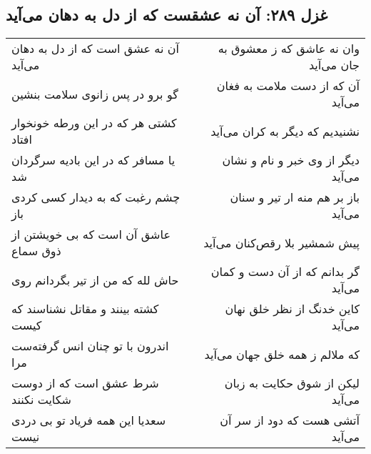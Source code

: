\begin{center}
\section*{غزل ۲۸۹: آن نه عشقست که از دل به دهان می‌آید}
\label{sec:289}
\begin{longtable}{l p{0.5cm} r}
آن نه عشق است که از دل به دهان می‌آید
&&
وان نه عاشق که ز معشوق به جان می‌آید
\\
گو برو در پس زانوی سلامت بنشین
&&
آن که از دست ملامت به فغان می‌آید
\\
کشتی هر که در این ورطه خونخوار افتاد
&&
نشنیدیم که دیگر به کران می‌آید
\\
یا مسافر که در این بادیه سرگردان شد
&&
دیگر از وی خبر و نام و نشان می‌آید
\\
چشم رغبت که به دیدار کسی کردی باز
&&
باز بر هم منه ار تیر و سنان می‌آید
\\
عاشق آن است که بی خویشتن از ذوق سماع
&&
پیش شمشیر بلا رقص‌کنان می‌آید
\\
حاش لله که من از تیر بگردانم روی
&&
گر بدانم که از آن دست و کمان می‌آید
\\
کشته بینند و مقاتل نشناسند که کیست
&&
کاین خدنگ از نظر خلق نهان می‌آید
\\
اندرون با تو چنان انس گرفته‌ست مرا
&&
که ملالم ز همه خلق جهان می‌آید
\\
شرط عشق است که از دوست شکایت نکنند
&&
لیکن از شوق حکایت به زبان می‌آید
\\
سعدیا این همه فریاد تو بی دردی نیست
&&
آتشی هست که دود از سر آن می‌آید
\\
\end{longtable}
\end{center}
